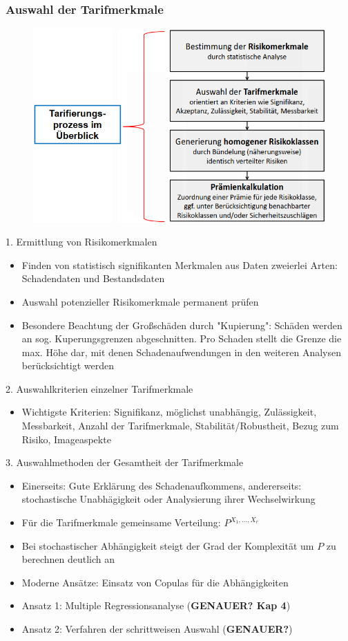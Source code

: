 \documentclass[12pt]{report}
\theoremstyle{dotless}
\theoremstyle{definition}
\begin{document}
\subsubsection{Auswahl der Tarifmerkmale}
\begin{figure}[ht]
	\centering
	\includegraphics[width = .8\textwidth]{Bilder/Tarifierung.png}
\end{figure}
1. Ermittlung von Risikomerkmalen
\begin{itemize}
\item Finden von statistisch signifikanten Merkmalen aus Daten zweierlei Arten: Schadendaten und Bestandsdaten
\item Auswahl potenzieller Risikomerkmale permanent prüfen
\item Besondere Beachtung der Großschäden durch "Kupierung": Schäden werden an sog. Kuperungsgrenzen abgeschnitten. Pro Schaden stellt die Grenze die max. Höhe dar, mit denen Schadenaufwendungen in den weiteren Analysen berücksichtigt werden
\end{itemize}
2. Auswahlkriterien einzelner Tarifmerkmale
\begin{itemize}
\item Wichtigste Kriterien: Signifikanz, möglichst unabhängig, Zulässigkeit, Messbarkeit, Anzahl der Tarifmerkmale, Stabilität/Robustheit, Bezug zum Risiko, Imageaspekte
\end{itemize}
3. Auswahlmethoden der Gesamtheit der Tarifmerkmale
\begin{itemize}
\item Einerseits: Gute Erklärung des Schadenaufkommens, andererseits: stochastische Unabhägigkeit oder Analysierung ihrer Wechselwirkung
\item Für die Tarifmerkmale gemeinsame Verteilung: $P^{X_1,...,X_r}$
\item Bei stochastischer Abhängigkeit steigt der Grad der Komplexität um $P$ zu berechnen deutlich an
\item Moderne Ansätze: Einsatz von Copulas für die Abhängigkeiten
\item Ansatz 1: Multiple Regressionsanalyse (\textbf{GENAUER? Kap 4})
\item Ansatz 2: Verfahren der schrittweisen Auswahl (\textbf{GENAUER?})
\end{itemize}
\end{document}
